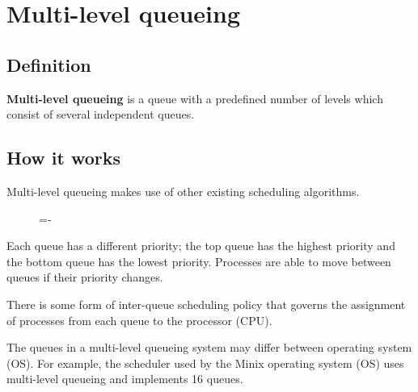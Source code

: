 \documentclass[a4paper]{systems-software}
\begin{document}
\section*{Multi-level queueing}

\subsection*{Definition}

\textbf{Multi-level queueing} is a queue with a predefined number of levels which consist of several independent queues.


\subsection*{How it works}

Multi-level queueing makes use of other existing scheduling algorithms.

\begin{figure}[H]
  \lineskip=-\fboxrule
\end{figure}

Each queue has a different priority; the top queue has the highest priority and the bottom queue has the lowest priority. Processes are able to move between queues if their priority changes.

There is some form of inter-queue scheduling policy that governs the assignment of processes from each queue to the processor (CPU).

The queues in a multi-level queueing system may differ between operating system (OS). For example, the scheduler used by the Minix operating system (OS) uses multi-level queueing and implements 16 queues.
\end{document}
